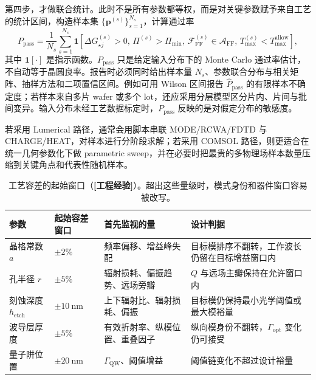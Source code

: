 第四步，才做联合统计。此时不是所有参数都等权，而是对关键参数赋予来自工艺的统计区间，构造样本集 $\{\bm{p}^{(s)}\}_{s=1}^{N_s}$，计算通过率
\begin{equation}
P_{\mathrm{pass}}
=
\frac{1}{N_s}
\sum_{s=1}^{N_s}
\mathbf{1}\!\left[
\Delta G_{\star j}^{(s)} > 0,\,
\Pi^{(s)}>\Pi_{\min},\,
\mathcal{F}_{\mathrm{FF}}^{(s)}\in \mathcal{A}_{\mathrm{FF}},\,
T_{\max}^{(s)}<T_{\max}^{\mathrm{allow}}
\right],
\label{eq:pass-rate}
\end{equation}
其中 $\mathbf{1}[\cdot]$ 是指示函数。$P_{\mathrm{pass}}$ 只是给定输入分布下的 Monte Carlo 通过率估计，不自动等于晶圆良率。报告时必须同时给出样本量 $N_s$、参数联合分布与相关矩阵、抽样方法和二项置信区间。例如可用 Wilson 区间报告 $\hat P_{\mathrm{pass}}$ 的有限样本不确定度；若样本来自多片 wafer 或多个 lot，还应采用分层模型区分片内、片间与批间变异。输入分布未经工艺数据标定时，$P_{\mathrm{pass}}$ 反映的是对假定分布的敏感度。

若采用 Lumerical 路径，通常会用脚本串联 MODE/RCWA/FDTD 与 CHARGE/HEAT，对样本进行分阶段求解；若采用 COMSOL 路径，则更适合在统一几何参数化下做 parametric sweep，并在必要时把最贵的多物理场样本数量压缩到关键角点和代表性随机样本。

\begin{table}[htbp]
  \centering
  \footnotesize
  \caption{工艺容差的起始窗口（\textbf{[工程经验]}）。超出这些量级时，模式身份和器件窗口容易被改写。}
  \label{tab:robustness_tolerance_start}
  \begin{tabularx}{\textwidth}{@{}p{2.5cm}p{2.3cm}p{3.0cm}Y@{}}
    \toprule
    参数 & 起始容差窗口 & 首先监视的量 & 设计判据 \\ \midrule
    晶格常数 $a$ & $\pm 2\%$ & 频率偏移、增益峰失配 & 目标模排序不翻转，工作波长仍留在目标增益窗口内 \\
    孔半径 $r$ & $\pm 5\%$ & 辐射损耗、偏振趋势、远场旁瓣 & $Q$ 与远场主瓣保持在允许窗口内 \\
    刻蚀深度 $h_{\mathrm{etch}}$ & $\pm \SI{10}{\nano\meter}$ & 上下辐射比、辐射损耗、偏振 & 目标模仍保持最小光学阈值或最大模裕量 \\
    波导层厚度 & $\pm 5\%$ & 有效折射率、纵模位置、重叠因子 & 纵向模身份不翻转，$\Gamma_{\mathrm{opt}}$ 变化仍可接受 \\
    量子阱位置 & $\pm \SI{20}{\nano\meter}$ & $\Gamma_{\mathrm{QW}}$、阈值增益 & 阈值链变化不超过设计裕量 \\
    \bottomrule
  \end{tabularx}
\end{table}

